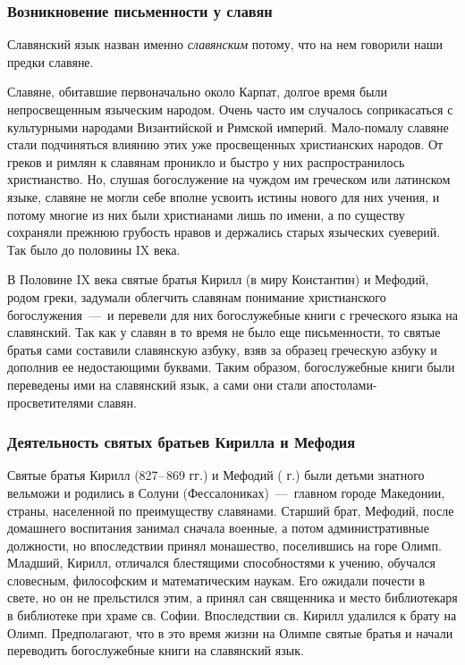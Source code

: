 \documentclass[11pt,a4paper,oneside]{memoir}
\begin{document}
        \subsubsection{Возникновение письменности у славян}

        Славянский язык назван именно \emph{славянским} потому, что
        на нем говорили наши предки славяне.

        Славяне, обитавшие первоначально около Карпат, долгое время
        были непросвещенным языческим народом. Очень часто им
        случалось соприкасаться с культурными народами Византийской и
        Римской империй. Мало-помалу славяне стали подчиняться
        влиянию этих уже просвещенных христианских народов. От греков
        и римлян к славянам проникло и быстро у них распространилось
        христианство. Но, слушая богослужение на чуждом им греческом
        или латинском языке, славяне не могли себе вполне усвоить
        истины нового для них учения, и потому многие из них были
        христианами лишь по имени, а по существу сохраняли прежнюю
        грубость нравов и держались старых языческих суеверий. Так
        было до половины IX века.

        В Половине IX века святые братья Кирилл (в миру Константин) и
        Мефодий, родом греки, задумали облегчить славянам понимание
        христианского богослужения~---~и перевели для них
        богослужебные книги с греческого языка на славянский. Так как
        у славян в то время не было еще письменности, то святые
        братья сами составили славянскую азбуку, взяв за образец
        греческую азбуку и дополнив ее недостающими буквами. Таким
        образом, богослужебные книги были переведены ими на
        славянский язык, а сами они стали апостолами-просветителями славян.

        \subsubsection{Деятельность святых братьев Кирилла и Мефодия}

        Святые братья Кирилл (827--\,869 гг.) и Мефодий ( г.)
        были детьми знатного вельможи и родились в Солуни
        (Фессалониках)~---~главном городе Македонии, страны,
        населенной по преимуществу славянами. Старший брат, Мефодий,
        после домашнего воспитания занимал сначала военные, а потом
        административные должности, но впоследствии принял
        монашество, поселившись на горе Олимп. Младший, Кирилл,
        отличался блестящими способностями к учению, обучался
        словесным, философским и математическим наукам. Его ожидали
        почести в свете, но он не прельстился этим, а принял сан
        священника и место библиотекаря в библиотеке при храме св.
        Софии. Впоследствии св. Кирилл удалился к брату на Олимп.
        Предполагают, что в это время жизни на Олимпе святые братья и
        начали переводить богослужебные книги на славянский язык.
\end{document}
